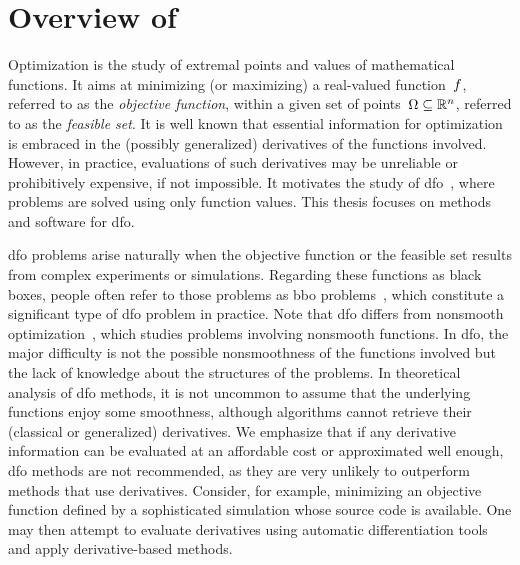 %
%
%
%
%
%
%
%
%
%
%

\section{Overview of }
\label{sec:overview}

Optimization is the study of extremal points and values of mathematical functions.
It aims at minimizing (or maximizing) a real-valued function~$f$, referred to as the \emph{objective function}, within a given set of points~$\Omega \subseteq \mathbb{R}^n$, referred to as the \emph{feasible set}.
It is well known that essential information for optimization is embraced in the (possibly generalized) derivatives of the functions involved.
However, in practice, evaluations of such derivatives may be unreliable or prohibitively expensive, if not impossible.
It motivates the study of \gls{dfo}~\cite{Conn_Scheinberg_Vicente_2009b,Audet_Hare_2017,Custodio_Scheinberg_Vicente_2017,Larson_Menickelly_Wild_2019}, where problems are solved using only function values.
This thesis focuses on methods and software for \gls{dfo}.

\Gls{dfo} problems arise naturally when the objective function or the feasible set results from complex experiments or simulations.
Regarding these functions as black boxes, people often refer to those problems as \gls{bbo} problems~\cite{Audet_Hare_2017}, which constitute a significant type of \gls{dfo} problem in practice.
Note that \gls{dfo} differs from nonsmooth optimization~\cite{Clark_1983,Cui_Pang_2021}, which studies problems involving nonsmooth functions.
In \gls{dfo}, the major difficulty is not the possible nonsmoothness of the functions involved but the lack of knowledge about the structures of the problems.
In theoretical analysis of \gls{dfo} methods, it is not uncommon to assume that the underlying functions enjoy some smoothness, although algorithms cannot retrieve their (classical or generalized) derivatives.
We emphasize that if any derivative information can be evaluated at an affordable cost or approximated well enough, \gls{dfo} methods are not recommended, as they are very unlikely to outperform methods that use derivatives.
Consider, for example, minimizing an objective function defined by a sophisticated simulation whose source code is available.
One may then attempt to evaluate derivatives using automatic differentiation tools~\cite{Griewank_2003,Griewank_Walther_2008} and apply derivative-based methods.

